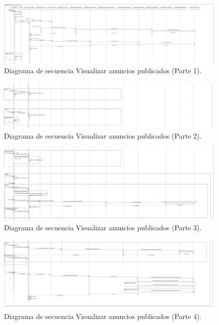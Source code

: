 \FloatBarrier
\begin{figure}[htbp!]
		\centering
			\includegraphics[width=1 \textwidth]{imagenes/DSRuben/anuncios1}
		\caption{Diagrama de secuencia Visualizar anuncios publicados (Parte 1).}
		\label{PADS:VisualizarAnuncio1}
\end{figure}
\FloatBarrier

\FloatBarrier
\begin{figure}[htbp!]
		\centering
			\includegraphics[width=1 \textwidth]{imagenes/DSRuben/anuncios2}
		\caption{Diagrama de secuencia Visualizar anuncios publicados (Parte 2).}
		\label{PADS:VisualizarAnuncio2}
\end{figure}
\FloatBarrier

\FloatBarrier
\begin{figure}[htbp!]
		\centering
			\includegraphics[width=1 \textwidth]{imagenes/DSRuben/anuncios3}
		\caption{Diagrama de secuencia Visualizar anuncios publicados (Parte 3).}
		\label{PADS:VisualizarAnuncio3}
\end{figure}
\FloatBarrier

\FloatBarrier
\begin{figure}[htbp!]
		\centering
			\includegraphics[width=1 \textwidth]{imagenes/DSRuben/anuncios4}
		\caption{Diagrama de secuencia Visualizar anuncios publicados (Parte 4).}
		\label{PADS:VisualizarAnuncio4}
\end{figure}
\FloatBarrier

